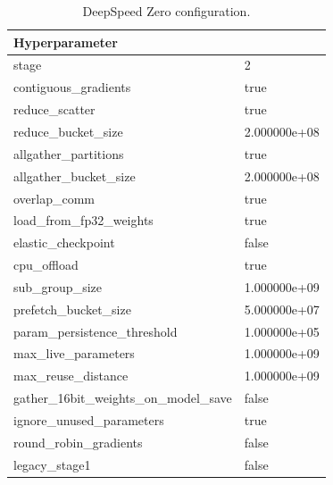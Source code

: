 \begin{table}
    \def\arraystretch{1.5}
    \small
    \centering
    \caption{DeepSpeed Zero configuration.}
    \label{tab:deepspeed-config}
    \begin{tabularx}{\textwidth}{XX}
        \toprule
        \textbf{Hyperparameter} & \\
        \midrule
        stage & 2\\
        contiguous\_gradients & true\\
        reduce\_scatter & true\\
        reduce\_bucket\_size & 2.000000e+08\\
        allgather\_partitions & true\\
        allgather\_bucket\_size & 2.000000e+08\\
        overlap\_comm & true\\
        load\_from\_fp32\_weights & true\\
        elastic\_checkpoint & false\\
        cpu\_offload\ & true\\
        sub\_group\_size & 1.000000e+09\\
        prefetch\_bucket\_size & 5.000000e+07\\
        param\_persistence\_threshold & 1.000000e+05\\
        max\_live\_parameters & 1.000000e+09\\
        max\_reuse\_distance & 1.000000e+09\\
        gather\_16bit\_weights\_on\_model\_save & false\\
        ignore\_unused\_parameters & true\\
        round\_robin\_gradients & false\\
        legacy\_stage1 & false\\
        \bottomrule
    \end{tabularx}
\end{table}

